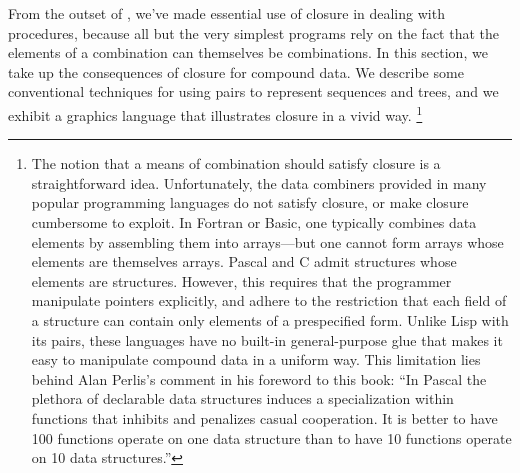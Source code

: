 From the outset of , we’ve made essential use of closure in dealing with procedures, because all but the very simplest programs rely on the fact that the elements of a combination can themselves be combinations.
In this section, we take up the consequences of closure for compound data.
We describe some conventional techniques for using pairs to represent sequences and trees, and we exhibit a graphics language that illustrates closure in a vivid way.%
\footnote{
	The notion that a means of combination should satisfy closure is a straightforward idea.
	Unfortunately, the data combiners provided in many popular programming languages do not satisfy closure, or make closure cumbersome to exploit.
	In Fortran or Basic, one typically combines data elements by assembling them into arrays---but one cannot form arrays whose elements are themselves arrays.
	Pascal and C admit structures whose elements are structures.
	However, this requires that the programmer manipulate pointers explicitly, and adhere to the restriction that each field of a structure can contain only elements of a prespecified form.
	Unlike Lisp with its pairs, these languages have no built-in general-purpose glue that makes it easy to manipulate compound data in a uniform way.
	This limitation lies behind Alan Perlis’s comment in his foreword to this book:
	“In Pascal the plethora of declarable data structures induces a specialization within functions that inhibits and penalizes casual cooperation.
	It is better to have 100 functions operate on one data structure than to have 10 functions operate on 10 data structures.”
}






